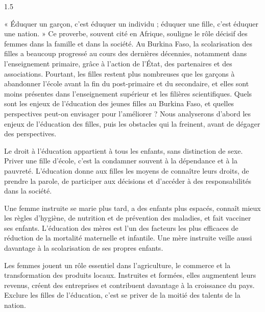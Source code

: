 \documentclass[12pt]{article}
\begin{document}
\begin{spacing}{1.5}


« Éduquer un garçon, c'est éduquer un individu ; éduquer une fille, c'est éduquer une nation. » Ce proverbe, souvent cité en Afrique, souligne le rôle décisif des femmes dans la famille et dans la société. Au Burkina Faso, la scolarisation des filles a beaucoup progressé au cours des dernières décennies, notamment dans l'enseignement primaire, grâce à l'action de l'État, des partenaires et des associations. Pourtant, les filles restent plus nombreuses que les garçons à abandonner l'école avant la fin du post-primaire et du secondaire, et elles sont moins présentes dans l'enseignement supérieur et les filières scientifiques. Quels sont les enjeux de l'éducation des jeunes filles au Burkina Faso, et quelles perspectives peut-on envisager pour l'améliorer ? Nous analyserons d'abord les enjeux de l'éducation des filles, puis les obstacles qui la freinent, avant de dégager des perspectives.


Le droit à l'éducation appartient à tous les enfants, sans distinction de sexe. Priver une fille d'école, c'est la condamner souvent à la dépendance et à la pauvreté. L'éducation donne aux filles les moyens de connaître leurs droits, de prendre la parole, de participer aux décisions et d'accéder à des responsabilités dans la société.

Une femme instruite se marie plus tard, a des enfants plus espacés, connaît mieux les règles d'hygiène, de nutrition et de prévention des maladies, et fait vacciner ses enfants. L'éducation des mères est l'un des facteurs les plus efficaces de réduction de la mortalité maternelle et infantile. Une mère instruite veille aussi davantage à la scolarisation de ses propres enfants.

Les femmes jouent un rôle essentiel dans l'agriculture, le commerce et la transformation des produits locaux. Instruites et formées, elles augmentent leurs revenus, créent des entreprises et contribuent davantage à la croissance du pays. Exclure les filles de l'éducation, c'est se priver de la moitié des talents de la nation.



\end{spacing}
\end{document}
